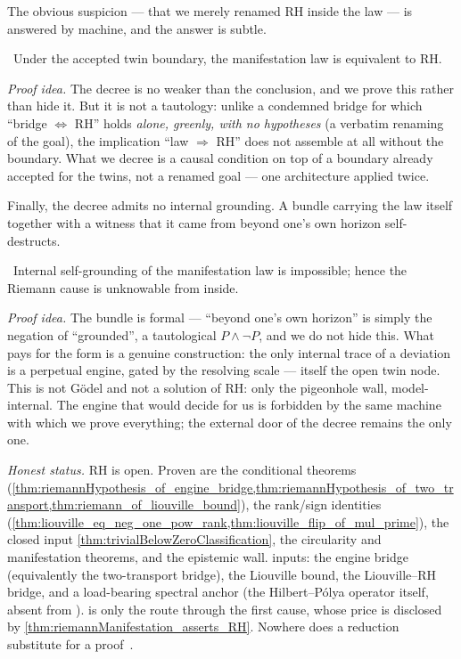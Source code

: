The obvious suspicion --- that we merely renamed RH inside the law --- is answered by machine, and
the answer is subtle.

\begin{theorem}\label{thm:riemannManifestation_asserts_RH}
\yellow{}\ Under the accepted twin boundary, the manifestation law is equivalent to RH.
\end{theorem}

\emph{Proof idea.} The decree is no weaker than the conclusion, and we prove this rather than hide
it. But it is not a tautology: unlike a condemned bridge for which ``bridge $\iff$ RH'' holds
\emph{alone, greenly, with no hypotheses} (a verbatim renaming of the goal), the implication ``law
$\Rightarrow$ RH'' does not assemble at all without the boundary. What we decree is a causal
condition on top of a boundary already accepted for the twins, not a renamed goal --- one
architecture applied twice.

Finally, the decree admits no internal grounding. A bundle carrying the law itself together with a
witness that it came from beyond one's own horizon self-destructs.

\begin{theorem}\label{thm:no_internalisedRiemannGround}
\green{}\ Internal self-grounding of the manifestation law is impossible; hence the Riemann cause is
unknowable from inside. 
\end{theorem}

\emph{Proof idea.} The bundle is formal --- ``beyond one's own horizon'' is simply the negation of
``grounded'', a tautological $P\wedge\neg P$, and we do not hide this. What pays for the form is a
genuine construction: the only internal trace of a deviation is a perpetual engine, gated by the
resolving scale --- itself the open twin node. This is not G\"odel and not a solution of RH: only the
pigeonhole wall, model-internal. The engine that would decide for us is forbidden by the same machine
with which we prove everything; the external door of the decree remains the only one.

\medskip

\noindent\emph{Honest status.} RH is \red{} open. Proven \green{} are the conditional theorems
(\cref{thm:riemannHypothesis_of_engine_bridge,thm:riemannHypothesis_of_two_transport,thm:riemann_of_liouville_bound}),
the rank/sign identities
(\cref{thm:liouville_eq_neg_one_pow_rank,thm:liouville_flip_of_mul_prime}), the closed input
\cref{thm:trivialBelowZeroClassification}, the circularity and manifestation theorems, and the
epistemic wall. \red{} inputs: the engine bridge (equivalently the two-transport bridge), the
Liouville bound, the Liouville--RH bridge, and a load-bearing spectral anchor (the Hilbert--P\'olya
operator itself, absent from ). \yellow{} is only the route through the first cause,
whose price is disclosed by \cref{thm:riemannManifestation_asserts_RH}. Nowhere does a reduction
substitute for a proof~\cite{clay-rh}.
